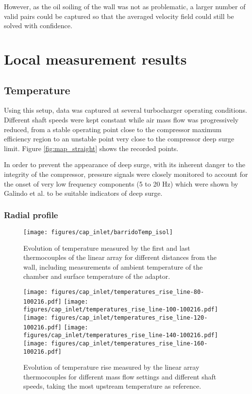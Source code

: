 However, as the oil soiling of the wall was not as problematic, a larger number of valid pairs could be captured so that the averaged velocity field could still be solved with confidence.

\section{Local measurement results}

\subsection{Temperature}
\label{sub:temperature}

Using this setup, data was captured at several turbocharger operating conditions. Different shaft speeds were kept constant while air mass flow was progressively reduced, from a stable operating point close to the compressor maximum efficiency region to an unstable point very close to the compressor deep surge limit. Figure \ref{fig:map_straight} shows the recorded points.

In order to prevent the appearance of deep surge, with its inherent danger to the integrity of the compressor, pressure signals were closely monitored to account for the onset of very low frequency components (5 to 20 Hz) which were shown by Galindo et al. \cite{galindo2013engine} to be suitable indicators of deep surge.

\subsubsection{Radial profile}

\begin{figure}[b!]
\centering
\texttt{[image: figures/cap\_inlet/barridoTemp\_isol]}
\caption{Evolution of temperature measured by the first and last thermocouples of the linear array for different distances from the wall, including measurements of ambient temperature of the chamber and surface temperature of the adaptor.}
\label{fig:barrido_temp}
\end{figure}

\begin{figure}[htb!]
\texttt{[image: figures/cap\_inlet/temperatures\_rise\_line-80-100216.pdf]}
\texttt{[image: figures/cap\_inlet/temperatures\_rise\_line-100-100216.pdf]}
\texttt{[image: figures/cap\_inlet/temperatures\_rise\_line-120-100216.pdf]}
\texttt{[image: figures/cap\_inlet/temperatures\_rise\_line-140-100216.pdf]}
\texttt{[image: figures/cap\_inlet/temperatures\_rise\_line-160-100216.pdf]}
\caption{Evolution of temperature rise measured by the linear array thermocouples for different mass flow settings and different shaft speeds, taking the most upstream temperature as reference.}
\label{fig:temp_line_linear}
\end{figure}

